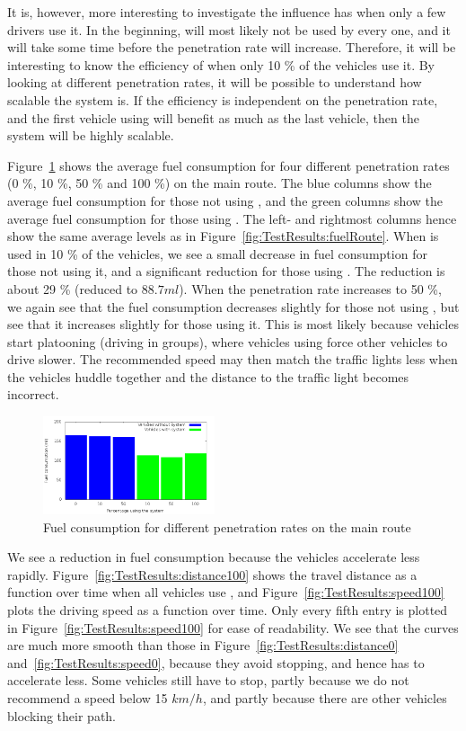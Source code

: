 It is, however, more interesting to investigate the influence \tech has when only a few drivers use it.
In the beginning, \tech will most likely not be used by every one, and it will take some time before the penetration rate will increase.
Therefore, it will be interesting to know the efficiency of \tech when only 10 \% of the vehicles use it. 
By looking at different penetration rates, it will be possible to understand how scalable the system is.
If the efficiency is independent on the penetration rate, and the first vehicle using \tech will benefit as much as the last vehicle, then the system will be highly scalable.

Figure~\ref{fig:TestResults:combinedFuel} shows the average fuel consumption for four different penetration rates (0 \%, 10 \%, 50 \% and 100 \%) on the main route.
The blue columns show the average fuel consumption for those not using \tech, and the green columns show the average fuel consumption for those using \tech.
The left- and rightmost columns hence show the same average levels as in Figure~\ref{fig:TestResults:fuelRoute}.
When \tech is used in 10 \% of the vehicles, we see a small decrease in fuel consumption for those not using it, and a significant reduction for those using \tech.
The reduction is about 29 \% (reduced to $88.7 ml$).
When the penetration rate increases to 50 \%, we again see that the fuel consumption decreases slightly for those not using \tech, but see that it increases slightly for those using it.
This is most likely because vehicles start platooning (driving in groups), where vehicles using \tech force other vehicles to drive slower.
The recommended speed may then match the traffic lights less when the vehicles huddle together and the distance to the traffic light becomes incorrect.

\begin{figure}[htb]
\includegraphics[width=0.45\textwidth]{../images/tp0c1_0/combinedFuel.png}
\caption{Fuel consumption for different penetration rates on the main route}
\label{fig:TestResults:combinedFuel}
\end{figure}

We see a reduction in fuel consumption because the vehicles accelerate less rapidly. 
Figure~\ref{fig:TestResults:distance100} shows the travel distance as a function over time when all vehicles use \tech, and Figure~\ref{fig:TestResults:speed100} plots the driving speed as a function over time. 
Only every fifth entry is plotted in Figure~\ref{fig:TestResults:speed100} for ease of readability.
We see that the curves are much more smooth than those in Figure~\ref{fig:TestResults:distance0} and~\ref{fig:TestResults:speed0}, because they avoid stopping, and hence has to accelerate less.
Some vehicles still have to stop, partly because we do not recommend a speed below 15 $km/h$, and partly because there are other vehicles blocking their path.

